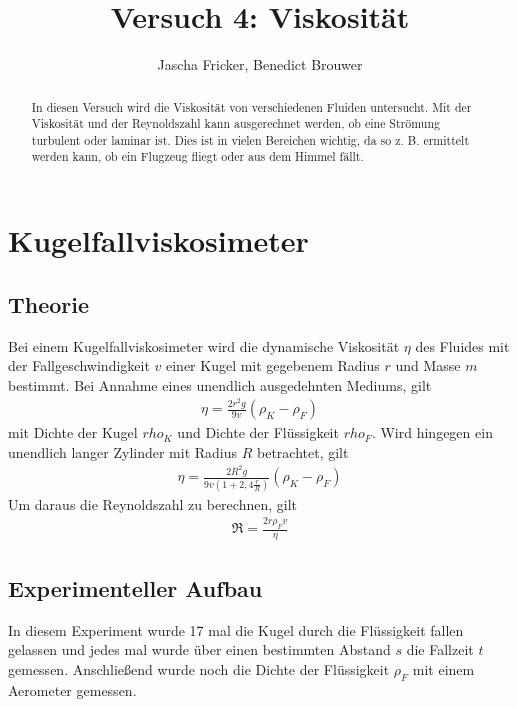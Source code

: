 \documentclass[11pt, a4paper]{article}
\title{Versuch 4: Viskosität}
\author{Jascha Fricker, Benedict Brouwer}
\begin{document}
    \maketitle

    

    \begin{abstract}
        In diesen Versuch wird die Viskosität von verschiedenen Fluiden untersucht. Mit der Viskosität
        und der Reynoldszahl kann ausgerechnet werden, ob eine Strömung turbulent oder laminar ist.
        Dies ist in vielen Bereichen wichtig, da so z. B. ermittelt werden kann, ob ein Flugzeug fliegt oder
        aus dem Himmel fällt.
    \end{abstract}

    \tableofcontents

    \newpage

    \section{Kugelfallviskosimeter}

    \subsection{Theorie}

    Bei einem Kugelfallviskosimeter wird die dynamische Viskosität $\eta$ des Fluides mit 
    der Fallgeschwindigkeit $v$ einer Kugel
    mit gegebenem Radius $r$ und Masse $m$ bestimmt.
    Bei Annahme eines unendlich ausgedehnten Mediums, gilt
    \begin{align}
        \eta = \frac{2r^2g}{9v}(\rho_K - \rho_F)
    \end{align}
    mit Dichte der Kugel $rho_K$ und Dichte der Flüssigkeit $rho_F$.
    Wird hingegen ein unendlich langer Zylinder mit Radius $R$ betrachtet, gilt
    \begin{align}
        \eta = \frac{2R^2g}{9v(1+2,4\frac{r}{R})}(\rho_K - \rho_F)
        \label{eq:cylinder}
    \end{align}
    Um daraus die Reynoldszahl zu berechnen, gilt
    \begin{align}
        \Re = \frac{2r \rho_F v}{\eta}
    \end{align}

    \subsection{Experimenteller Aufbau}
    In diesem Experiment wurde 17 mal die Kugel durch die Flüssigkeit fallen gelassen und
    jedes mal wurde über einen bestimmten Abstand $s$ die Fallzeit $t$ gemessen.
    Anschließend wurde noch die Dichte der Flüssigkeit $\rho_F$ mit einem Aerometer gemessen.
    
\end{document}
